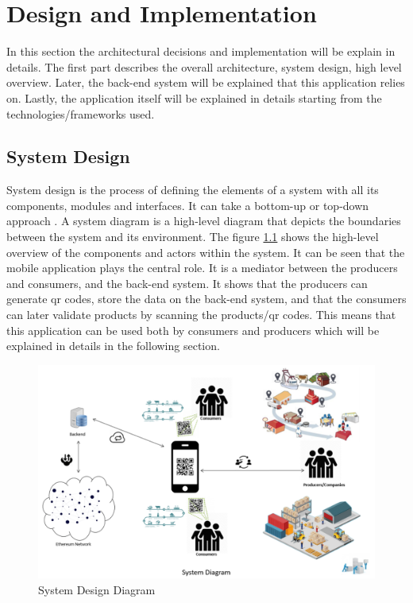 \chapter{Design and Implementation}

In this section the architectural decisions and implementation will be explain in details. The first part describes the overall architecture, system design, high level overview. Later, the back-end system will be explained that this application relies on. Lastly, the application itself will be explained in details starting from the technologies/frameworks used.

\section{System Design}


System design is the process of defining the elements of a system with all its components, modules and interfaces. It can take a bottom-up or top-down approach \cite{system_design_def}. A system diagram is a high-level diagram that depicts the boundaries between the system and its environment. The figure \ref{fig:system_diagram} shows the high-level overview of the components and actors within the system. It can be seen that the mobile application plays the central role. It is a mediator between the producers and consumers, and the back-end system. It shows that the producers can generate qr codes, store the data on the back-end system, and that the consumers can later validate products by scanning the products/qr codes. This means that this application can be used both by consumers and producers which will be explained in details in the following section.

\begin{figure}[ht]
\includegraphics[width=\linewidth]{figures/system_diagram.png}
\caption{System Design Diagram \cite{atif_is}}
\label{fig:system_diagram}
\end{figure}

